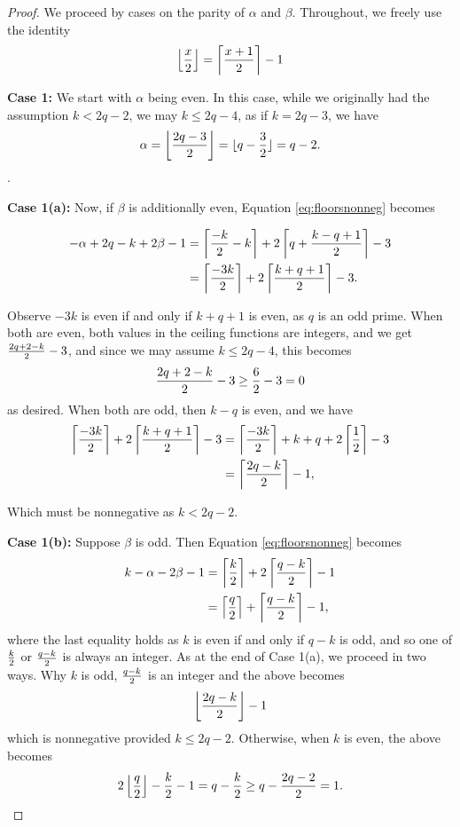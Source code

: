 \documentclass[10pt,a4paper]{amsart}
\begin{document}
\begin{proof}

We proceed by cases on the parity of $\alpha$ and $\beta$. Throughout, we freely use the identity \[\left\lfloor{x\over 2}\right\rfloor=\left\lceil {x+1\over 2}\right\rceil-1\]

\noindent\textbf{Case 1:}
We start with $\alpha$ being even. In this case, while we originally had the assumption $k<2q-2$, we may  $k\leq 2q-4$, as if $k=2q-3$, we have 
\[\alpha=\left\lfloor {2q-3\over 2}\right\rfloor=\lfloor q-{3\over 2}\rfloor=q-2.\].

\noindent \textbf{Case 1(a):}
Now, if  $\beta$ is additionally even, Equation \ref{eq:floorsnonneg} becomes

\begin{align*}
-\alpha+2q-k+2\beta-1&=\left\lceil{-k\over 2}-k \right\rceil+ 2\left\lceil q+{k-q+1\over 2}\right\rceil-3\\
&=\left\lceil{-3k\over 2} \right\rceil+ 2\left\lceil {k+q+1\over 2}\right\rceil-3.
\end{align*}

Observe $-3k$ is even if and only if $k+q+1$ is even, as $q$ is an odd prime. When both are even, both values in the ceiling functions are integers, and we get ${2q+2-k\over 2}-3$, and since we may assume $k\leq 2q-4$, this becomes
\[{2q+2-k\over 2}-3\geq {6\over 2}-3=0\]
as desired. When both are odd, then $k-q$ is even, and we have
\begin{align*}
\left\lceil{-3k\over 2} \right\rceil+ 2\left\lceil {k+q+1\over 2}\right\rceil-3&=
\left\lceil{-3k\over 2} \right\rceil+ k+q+2\left\lceil {1\over 2}\right\rceil-3\\
&=
\left\lceil{2q-k\over 2} \right\rceil-1,
\end{align*}

Which must be nonnegative as $k<2q-2$. 

\noindent\textbf{Case 1(b):} Suppose $\beta$ is odd. Then Equation \ref{eq:floorsnonneg} becomes
\begin{align*}
k-\alpha -2\beta-1&=\left\lceil {k\over 2}\right\rceil+2\left\lceil{q-k\over 2}\right\rceil-1\\
&= \left\lceil {q\over 2}\right\rceil+\left\lceil{q-k\over 2}\right\rceil-1,
\end{align*}
where the last equality holds as $k$ is even if and only if $q-k$ is odd, and so one of ${k\over 2}$ or $q-k\over 2$ is always an integer. As at the end of Case 1(a), we proceed in two ways. Why $k$ is odd, ${q-k\over 2}$ is an integer and the above becomes
\[\left\lfloor{2q-k\over 2}\right\rfloor -1\]
which is nonnegative provided $k\leq 2q-2$. Otherwise, when $k$ is even, the above becomes
\[2\left\lfloor{q\over 2}\right\rfloor -{k\over 2}-1=q-{k\over 2}\geq q-{2q-2\over 2}=1.\]


\end{proof}
\end{document}
